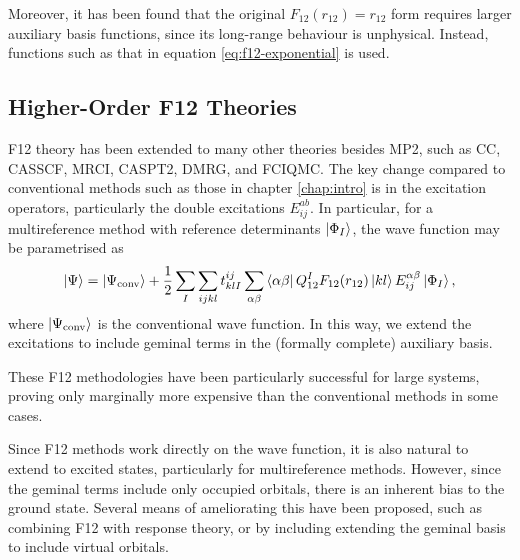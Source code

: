 Moreover, it has been found that the original $F_{12}(r_{12})=r_{12}$ form requires larger auxiliary basis functions, since its long-range behaviour is unphysical.\supercite{ten-noInitiation2004,ten-noNew2007} Instead, functions such as that in equation \ref{eq:f12-exponential} is used.

\subsection{Higher-Order F12 Theories}

F12 theory has been extended to many other theories besides MP2, such as \gls{CC}, \gls{CASSCF}, \gls{MRCI}, \gls{CASPT2}, \gls{DMRG}, and \gls{FCIQMC}.
\supercite{shiozakiMultireference2013,nogaCCR121992,nogaCoupled1994,gdanitzFormulation1993,gdanitzAccurately1998,flieglCoupledcluster2006,neissExtensions2006,kohnModified2009,bokhanCommunications2010,hofenerExtended2019,kedzuchMultireference2011,manbyExplicitly2006,neeseEfficient2009,wernerExplicitly2017,varganovVariational2010,ten-noSimple2007,shiozakiCommunication2010,sharmaSpectroscopic2014}
The key change compared to conventional methods such as those in chapter \ref{chap:intro} is in the excitation operators, particularly the double excitations $E_{ij}^{ab}$. In particular, for a multireference method with reference determinants $\ket{\Phi_I}$, the wave function may be parametrised as
\begin{equation}
    \ket\Psi = \ket{\Psi_\text{conv}} + \frac 12\sum_{I}\sum_{ijkl}t^{ij}_{klI}\sum_{\alpha\beta}\bra{\alpha\beta}Q_{12}^IF_{12}(r_{12})\ket{kl}E_{ij}^{\alpha\beta}\ket{\Phi_I},
\end{equation}
where $\ket{\Psi_\text{conv}}$ is the conventional wave function. In this way, we extend the excitations to include geminal terms in the (formally complete) auxiliary basis.

These F12 methodologies have been particularly successful for large systems, proving only marginally more expensive than the conventional methods in some cases.\supercite{adlerSimple2007,kniziaSimplified2009}

Since F12 methods work directly on the wave function, it is also natural to extend to excited states, particularly for multireference methods.
\supercite{floresAccurately2005,ten-noSimple2007,shiozakiCommunication2010,shiozakiExplicitly2011,flieglCoupledcluster2006}
However, since the geminal terms include only occupied orbitals, there is an inherent bias to the ground state.\supercite{flieglCoupledcluster2006,neissExtensions2006} Several means of ameliorating this have been proposed, such as combining F12 with response theory,\supercite{neissExtensions2006} or by including extending the geminal basis to include virtual orbitals.\supercite{kohnModified2009}

